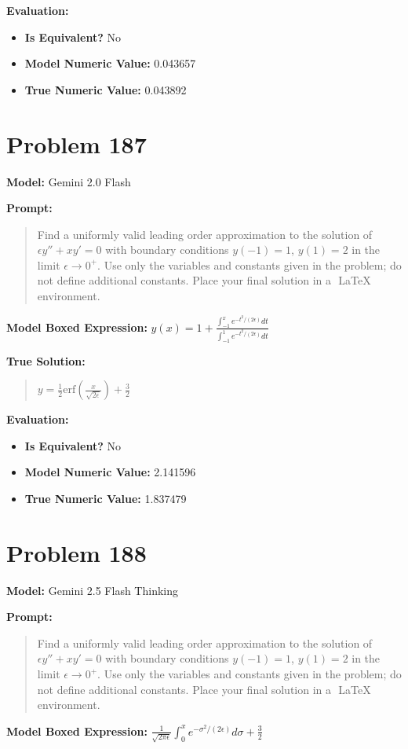 \documentclass{article}
\begin{document}
{\textbf{Evaluation:}
\begin{itemize}
\item \textbf{Is Equivalent?} No
\item \textbf{Model Numeric Value:} 0.043657
\item \textbf{True Numeric Value:} 0.043892
\end{itemize}
\vspace{1cm}
\section*{Problem 187}
\textbf{Model:} Gemini 2.0 Flash

\textbf{Prompt:}
\begin{quote}
Find a uniformly valid leading order approximation to the solution of $\epsilon y'' + x y' = 0$ with boundary conditions $y(-1) = 1$, $y(1) = 2$ in the limit $\epsilon \to 0^+$. Use only the variables and constants given in the problem; do not define additional constants. Place your final solution in a $\boxed{}$ LaTeX environment.
\end{quote}
\textbf{Model Boxed Expression:} $y(x) = 1 + \frac{\int_{-1}^x e^{-t^2/(2\epsilon)} dt}{\int_{-1}^1 e^{-t^2/(2\epsilon)} dt}$

\textbf{True Solution:}
\begin{quote}
$y = \frac{1}{2} \text{erf}\left(\frac{x}{\sqrt{2\epsilon}}\right) + \frac{3}{2}$
\end{quote}

\textbf{Evaluation:}
\begin{itemize}
\item \textbf{Is Equivalent?} No
\item \textbf{Model Numeric Value:} 2.141596
\item \textbf{True Numeric Value:} 1.837479
\end{itemize}
\vspace{1cm}
\section*{Problem 188}
\textbf{Model:} Gemini 2.5 Flash Thinking

\textbf{Prompt:}
\begin{quote}
Find a uniformly valid leading order approximation to the solution of $\epsilon y'' + x y' = 0$ with boundary conditions $y(-1) = 1$, $y(1) = 2$ in the limit $\epsilon \to 0^+$. Use only the variables and constants given in the problem; do not define additional constants. Place your final solution in a $\boxed{}$ LaTeX environment.
\end{quote}
\textbf{Model Boxed Expression:} $\frac{1}{\sqrt{2\pi\epsilon}} \int_0^x e^{-\sigma^2/(2\epsilon)} d\sigma + \frac{3}{2}$

}
\end{document}

